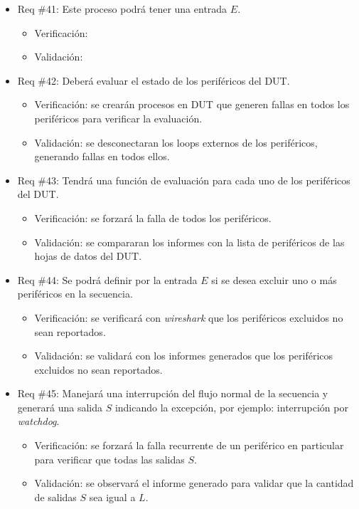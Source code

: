 \documentclass[
11pt, %
]{charter}
\begin{document}
\begin{itemize}
\item Req \#41: Este proceso podrá tener una entrada $ E $.
\begin{itemize}
    \item Verificación:
    \item Validación:
\end{itemize}

\item Req \#42: Deberá evaluar el estado de los periféricos del DUT.
\begin{itemize}
    \item Verificación: se crearán procesos en DUT que generen fallas en todos los periféricos para verificar la evaluación.
    \item Validación: se desconectaran los loops externos de los periféricos, generando fallas en todos ellos.
\end{itemize}

\item Req \#43: Tendrá una función de evaluación para cada uno de los periféricos del DUT.
\begin{itemize}
    \item Verificación: se forzará la falla de todos los periféricos.
    \item Validación: se compararan los informes con la lista de periféricos de las hojas de datos del DUT.
\end{itemize}

\item Req \#44: Se podrá definir por la entrada $ E $ si se desea excluir uno o más periféricos en la secuencia.
\begin{itemize}
    \item Verificación: se verificará con \emph{wireshark} que los periféricos excluidos no sean reportados.
    \item Validación: se validará con los informes generados que los periféricos excluidos no sean reportados.
\end{itemize}

\item Req \#45: Manejará una interrupción del flujo normal de la secuencia y generará una salida $ S $ indicando la excepción, por ejemplo: interrupción por \emph{watchdog}.
\begin{itemize}
    \item Verificación: se forzará la falla recurrente de un periférico en particular para verificar que todas las salidas $ S $.
    \item Validación: se observará el informe generado para validar que la cantidad de salidas $ S $ sea igual a $ L $.
\end{itemize}


\end{itemize}
\end{document}
